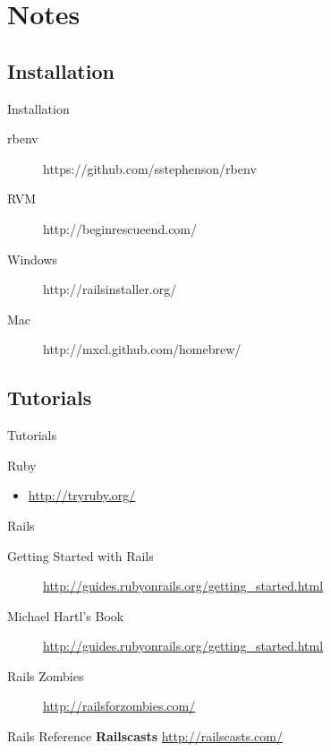 \documentclass[xcolor=svgnames]{beamer}
\begin{document}
\section{Notes}
\subsection{Installation}
\begin{frame}{Installation}
	\begin{description}
	  \item[rbenv]{https://github.com/sstephenson/rbenv}
	  \item[RVM]{http://beginrescueend.com/}
	  \item[Windows]{http://railsinstaller.org/}

	  \item[Mac]{http://mxcl.github.com/homebrew/}
	\end{description}
\end{frame}
\subsection{Tutorials}
\label{sub:Tutorials}
\begin{frame}{Tutorials}
  \begin{block}{Ruby}
  	\begin{itemize}
	  \item \url{http://tryruby.org/}
  	\end{itemize}
  \end{block}
  \begin{alertblock}{Rails}
  	
    \begin{description}
      \item[Getting Started with Rails] \url{http://guides.rubyonrails.org/getting_started.html}
      \item[Michael Hartl's Book]\url{http://guides.rubyonrails.org/getting_started.html}
      \item[Rails Zombies]\url{http://railsforzombies.com/}
    \end{description}
  \end{alertblock}
  \begin{block}{Rails Reference}
    \textbf{Railscasts} \url{http://railscasts.com/}
  \end{block}
\end{frame}
\end{document}
